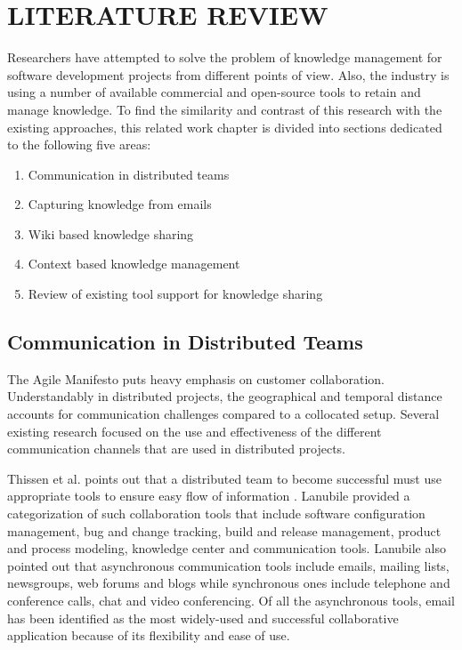 \fancyhead[RO,LE]{\thepage}
\fancyfoot{} 
\chapter{LITERATURE REVIEW}
Researchers have attempted to solve the problem of knowledge management for software development projects from different points of view. Also, the industry is using a number of available commercial and open-source tools to retain and manage knowledge. To find the similarity and contrast of this research with the existing approaches, this related work chapter is divided into sections dedicated to the following five areas:

\begin{enumerate}
	\item Communication in distributed teams
	\item Capturing knowledge from emails
	\item Wiki based knowledge sharing
	\item Context based knowledge management
	\item Review of existing tool support for knowledge sharing
\end{enumerate}

\section{Communication in Distributed Teams}
The Agile Manifesto\cite{am} puts heavy emphasis on customer collaboration. Understandably in distributed projects, the geographical and temporal distance accounts for communication challenges compared to a collocated setup. Several existing research focused on the use and effectiveness of the different communication channels that are used in distributed projects.

Thissen et al. points out that a distributed team to become successful must use appropriate tools to ensure easy flow of information \cite{communication_tools}. Lanubile provided a categorization of such collaboration tools \cite{communication_in_distributed} that include software configuration management, bug and change tracking, build and release management, product and process modeling, knowledge center and communication tools. Lanubile also pointed out that asynchronous communication tools include emails, mailing lists, newsgroups, web forums and blogs while synchronous ones include telephone and conference calls, chat and video conferencing. Of all the asynchronous tools, email has been identified as the most widely-used and successful collaborative application because of its flexibility and ease of use.

